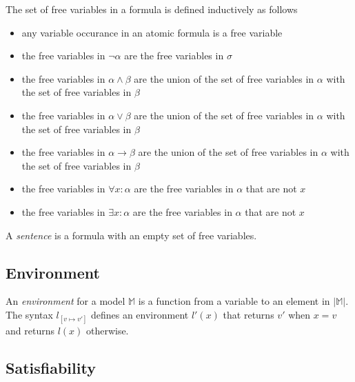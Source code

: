 		The set of free variables in a formula is defined inductively as follows
		\begin{itemize}
		\item any variable occurance in an atomic formula is a free variable
		\item the free variables in $\neg\alpha$ are the free variables in $\sigma$
		\item the free variables in $\alpha \wedge \beta$ are the union of the set of free variables in $\alpha$ with the set of free variables in $\beta$
		\item the free variables in $\alpha \vee   \beta$ are the union of the set of free variables in $\alpha$ with the set of free variables in $\beta$
		\item the free variables in $\alpha \to    \beta$ are the union of the set of free variables in $\alpha$ with the set of free variables in $\beta$
		\item the free variables in $\forall x : \alpha$ are the free variables in $\alpha$ that are not $x$
		\item the free variables in $\exists x : \alpha$ are the free variables in $\alpha$ that are not $x$
		\end{itemize}
		A \emph{sentence} is a formula with an empty set of free variables.

	\subsection{Environment}

		An \emph{environment} for a model $\mathbb{M}$ is a function from a
		variable to an element in $|\mathbb{M}|$. The syntax $l_{[v \mapsto
		v']}$ defines an environment $l'(x)$ that returns $v'$ when $x=v$
		and returns $l(x)$ otherwise.

	\subsection{Satisfiability}

